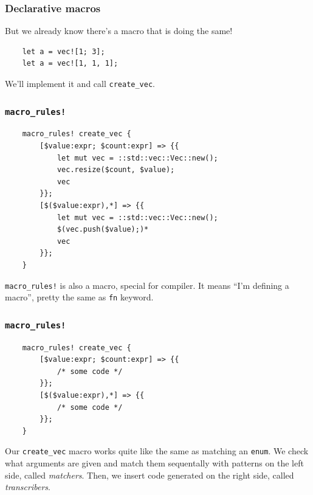 \documentclass[aspectratio=1610,t]{beamer}
\begin{document}

\begin{frame}[fragile]
\frametitle{Declarative macros}
But we already know there's a macro that is doing the same!

\begin{verbatim}
    let a = vec![1; 3];
    let a = vec![1, 1, 1];
\end{verbatim}

We'll implement it and call \texttt{create\_vec}.
\end{frame}


\begin{frame}[fragile]
\frametitle{\texttt{macro\_rules!}}
\begin{verbatim}
    macro_rules! create_vec {
        [$value:expr; $count:expr] => {{
            let mut vec = ::std::vec::Vec::new();
            vec.resize($count, $value);
            vec
        }};
        [$($value:expr),*] => {{
            let mut vec = ::std::vec::Vec::new();
            $(vec.push($value);)*
            vec
        }};
    }
\end{verbatim}

\texttt{macro\_rules!} is also a macro, special for compiler. It means ``I'm defining a macro'', pretty the same as \texttt{fn} keyword.
\end{frame}


\begin{frame}[fragile]
\frametitle{\texttt{macro\_rules!}}
\begin{verbatim}
    macro_rules! create_vec {
        [$value:expr; $count:expr] => {{
            /* some code */
        }};
        [$($value:expr),*] => {{
            /* some code */
        }};
    }
\end{verbatim}

Our \texttt{create\_vec} macro works quite like the same as matching an \texttt{enum}. We check what arguments are given and match them sequentally with patterns on the left side, called \textit{matchers}. Then, we insert code generated on the right side, called \textit{transcribers}.
\end{frame}

\end{document}
